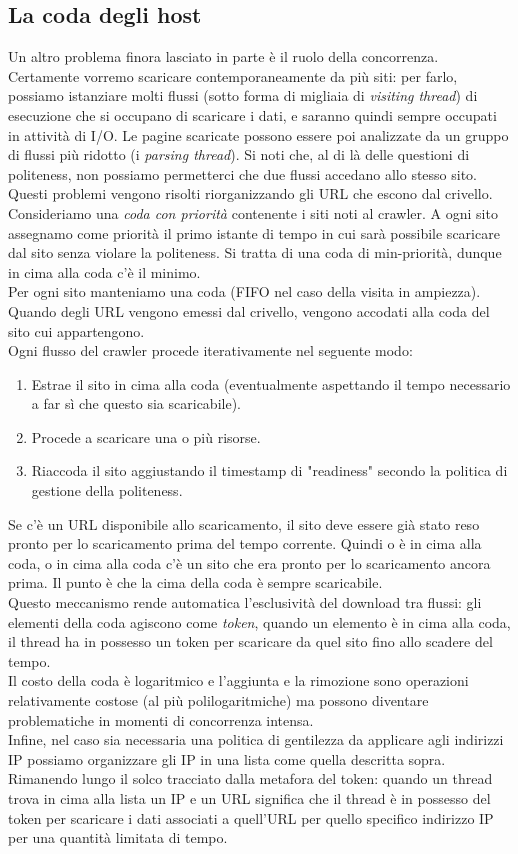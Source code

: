 \subsection{La coda degli host}
Un altro problema finora lasciato in parte è il ruolo della concorrenza. Certamente vorremo scaricare contemporaneamente da più siti: per farlo, possiamo istanziare molti flussi (sotto forma di migliaia di \textit{visiting thread}) di esecuzione che si occupano di scaricare i dati, e saranno quindi sempre occupati in attività di I/O. Le pagine scaricate possono essere poi analizzate da un gruppo di flussi più ridotto (i \textit{parsing thread}). Si noti che, al di là delle questioni di politeness, non possiamo permetterci che due flussi accedano allo stesso sito.\\
Questi problemi vengono risolti riorganizzando gli URL che escono dal crivello. Consideriamo una \textit{coda con priorità} contenente i siti noti al crawler. A ogni sito assegnamo come priorità il primo istante di tempo in cui sarà possibile scaricare dal sito senza violare la politeness. Si tratta di una coda di min-priorità, dunque in cima alla coda c'è il minimo.\\
Per ogni sito manteniamo una coda (FIFO nel caso della visita in ampiezza). Quando degli URL vengono emessi dal crivello, vengono accodati alla coda del sito cui appartengono.\\
Ogni flusso del crawler procede iterativamente nel seguente modo:
\begin{enumerate}
    \item Estrae il sito in cima alla coda (eventualmente aspettando il tempo necessario a far sì che questo sia scaricabile).
    \item Procede a scaricare una o più risorse.
    \item Riaccoda il sito aggiustando il timestamp di "readiness" secondo la politica di gestione della politeness.
\end{enumerate}
Se c'è un URL disponibile allo scaricamento, il sito deve essere già stato reso pronto per lo scaricamento prima del tempo corrente. Quindi o è in cima alla coda, o in cima alla coda c'è un sito che era pronto per lo scaricamento ancora prima. Il punto è che la cima della coda è sempre scaricabile.\\
Questo meccanismo rende automatica l'esclusività del download tra flussi: gli elementi della coda agiscono come \textit{token}, quando un elemento è in cima alla coda, il thread ha in possesso un token per scaricare da quel sito fino allo scadere del tempo.\\
Il costo della coda è logaritmico e l'aggiunta e la rimozione sono operazioni relativamente costose (al più polilogaritmiche) ma possono diventare problematiche in momenti di concorrenza intensa.\\
Infine, nel caso sia necessaria una politica di gentilezza da applicare agli indirizzi IP possiamo organizzare gli IP in una lista come quella descritta sopra. Rimanendo lungo il solco tracciato dalla metafora del token: quando un thread trova in cima alla lista un IP e un URL significa che il thread è in possesso del token per scaricare i dati associati a quell'URL per quello specifico indirizzo IP per una quantità limitata di tempo.